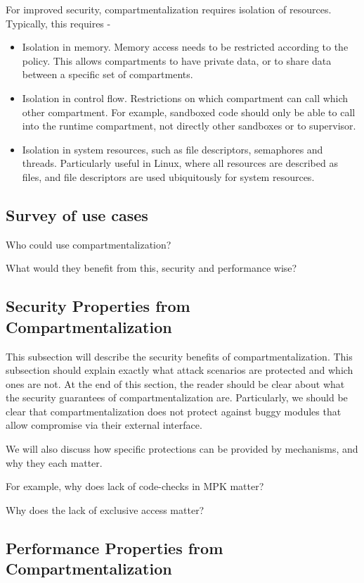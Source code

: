 For improved security, compartmentalization requires isolation of resources.
Typically, this requires - 
\begin{itemize}
  \item Isolation in memory. Memory access needs to be restricted according to
        the policy. This allows compartments to have private data, or to
        share data between a specific set of compartments.
  \item Isolation in control flow. Restrictions on which compartment can call
        which other compartment. 
        For example, sandboxed code should only be able to call into the
        runtime compartment, not directly other sandboxes or to supervisor.
  \item Isolation in system resources, such as file descriptors, semaphores
        and threads. 
        Particularly useful in Linux, where all resources are described as
        files, and file descriptors are used ubiquitously for system resources.

\end{itemize}

\subsection{Survey of use cases}

Who could use compartmentalization?

What would they benefit from this, security and performance wise?

\subsection{Security Properties from Compartmentalization}
This subsection will describe the security benefits of compartmentalization. This subsection should explain exactly what attack scenarios are protected and which ones are not. At the end of this section, the reader should be clear about what the security guarantees of compartmentalization are. Particularly, we should be clear that compartmentalization does not protect against buggy modules that allow compromise via their external interface.

We will also discuss how specific protections can be provided by mechanisms, and
why they each matter.

For example, why does lack of code-checks in MPK matter?

Why does the lack of exclusive access matter?

\subsection{Performance Properties from Compartmentalization}

